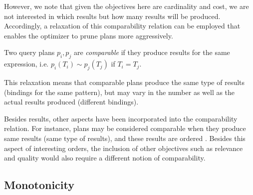 However, we note that given the objectives here are cardinality and cost, we are not interested in which results but how many results will be produced. 
Accordingly, a relaxation of this comparability relation can be employed that enables the optimizer to prune plans
more aggressively.

\begin{definition}
  \label{def:comparability}
  Two query plans $p_i, p_j$ are \emph{comparable} if they produce results for the same expression, i.e. $p_i(T_i) \sim  p_j(T_j)$ if $T_i = T_j$. 
\end{definition}

This relaxation means that comparable plans produce the same type of results (bindings for the same pattern), but may vary in the number as well as the actual results produced (different bindings). 

Besides results, other aspects have been incorporated into the comparability relation. For instance, plans may be considered comparable when they produce same results (same type of results), and these results are ordered . 
Besides this aspect of interesting orders, the inclusion of other objectives such as relevance and quality would also require a different notion of comparability.  

\subsection{Monotonicity}
\label{sec:sharing}

